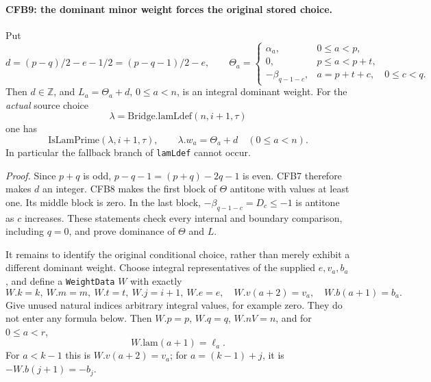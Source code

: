 \paragraph{CFB9: the dominant minor weight forces the original stored choice.}
\label{claim:CFB9}
Put
\[
 d=(p-q)/2-e-1/2=(p-q-1)/2-e,
 \qquad
 \Theta_a=
 \begin{cases}
       \alpha_a,&0\le a<p,\\
       0,&p\le a<p+t,\\
       -\beta_{q-1-c},&a=p+t+c,\quad0\le c<q.
 \end{cases}                                                    \tag{CFB.23}
\]
Then \(d\in\mathbb Z\), and \(L_a=\Theta_a+d\), \(0\le a<n\),
is an integral dominant weight.  For the \emph{actual} source choice
\[
        \lambda=\mathrm{Bridge.lamLdef}(n,i+1,\tau)
\]
one has
\[
 \mathrm{IsLamPrime}(\lambda,i+1,\tau),\qquad
                  \lambda.w_a=\Theta_a+d\quad(0\le a<n).
                                                               \tag{CFB.24}
\]
In particular the fallback branch of \texttt{lamLdef} cannot occur.

\emph{Proof.}
Since \(p+q\) is odd, \(p-q-1=(p+q)-2q-1\) is even.
CFB7 therefore makes \(d\) an integer.  CFB8 makes the first
block of \(\Theta\) antitone with values at least one.  Its
middle block is zero.  In the last block,
\(-\beta_{q-1-c}=D_c\le-1\) is antitone as \(c\) increases.
These statements check every internal and boundary comparison,
including \(q=0\), and prove dominance of \(\Theta\) and \(L\).

It remains to identify the original conditional choice, rather
than merely exhibit a different dominant weight.  Choose integral
representatives of the supplied \(e,v_a,b_a\), and define a
\texttt{WeightData} \(W\) with exactly
\[
 W.k=k,\ W.m=m,\ W.t=t,\ W.j=i+1,\ W.e=e,\quad
 W.v(a+2)=v_a,\quad W.b(a+1)=b_a.                             \tag{CFB.25}
\]
Give unused natural indices arbitrary integral values, for example
zero.  They do not enter any formula below.  Then
\(W.p=p\), \(W.q=q\), \(W.nV=n\), and for \(0\le a<r\),
\[
                         W.\mathrm{lam}(a+1)=\ell_a.           \tag{CFB.26}
\]
For \(a<k-1\) this is \(W.v(a+2)=v_a\); for
\(a=(k-1)+j\), it is \(-W.b(j+1)=-b_j\).

